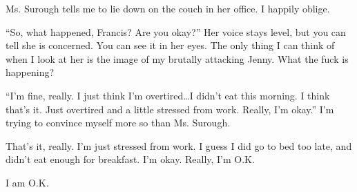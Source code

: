 Ms. Surough tells me to lie down on the couch in her office. I
happily oblige.

``So, what happened, Francis? Are you okay?'' Her voice
stays level, but you can tell she is concerned. You can see it in
her eyes. The only thing I can think of when I look at her is the
image of my brutally attacking Jenny. What the fuck is
happening?

``I'm fine, really. I just think I'm
overtired{\ldots}I didn't eat this morning. I think
that's it. Just overtired and a little stressed from work.
Really, I'm okay.'' I'm trying to convince myself
more so than Ms. Surough.

That's it, really. I'm just stressed from work. I guess
I did go to bed too late, and didn't eat enough for
breakfast. I'm okay. Really, I'm O.K.

I am O.K. 
 



